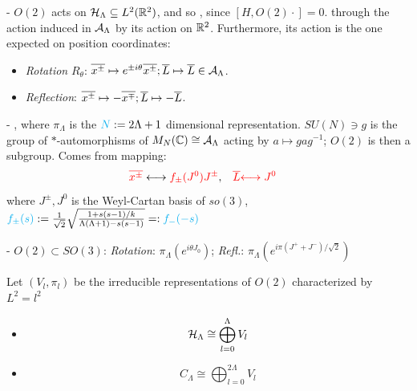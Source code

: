{
    \color{gray}
    
    - $O(2)$ acts on $\mathcal H_\Lambda \subseteq L^2(\mathbb{R}^2)$, and so , since $[H, O(2)\cdot ] = 0$. through the action induced in $\mathcal A_\Lambda$ by its action on $\mathbb{R}^2$. Furthermore, its action is the one expected on position coordinates:
        \begin{itemize}
            
        \item \textit{Rotation} $R_\theta$: $\overline{x^\pm} \mapsto e^{\pm i \theta} \overline{x ^\pm}; \overline{L} \mapsto \overline{L} \in \mathcal A_\Lambda$.
        
        \item \textit{Reflection}: $\overline{x^\pm} \mapsto -\overline{x^\mp}; \overline{L} \mapsto -\overline{L}$.
        
        \end{itemize}
    
    - , where $\pi_\Lambda$ is the $\textcolor{cyan}{N} := 2 \Lambda + 1$ dimensional representation. $SU(N) \ni g$ is the group of $*$-automorphisms of $M_N(\mathbb{C}) \cong \mathcal A_\Lambda$ acting by $a \mapsto g a g^{-1}$; $O(2)$ is then a subgroup. Comes from mapping:
    \begin{align}
        \textcolor{red}{\overline{x^\pm}} &\longleftrightarrow \textcolor{red}{f_\pm (J^0) J^\pm}, &
        \textcolor{red}{\overline{L} }& \textcolor{red}{\longleftrightarrow J^0}
    \end{align}
    where $J^\pm, J^0$ is the Weyl-Cartan basis of $so(3)$, $\textcolor{cyan}{f_\pm(s)} := \frac{1}{\sqrt{2}} \sqrt{\frac{1 + s(s-1)/k}{\Lambda (\Lambda + 1) - s(s-1)}} =: \textcolor{cyan}{f_-(-s)}$%

    - $O(2) \subset SO(3)$: \textit{Rotation}: $\pi_\Lambda(e^{i \theta J_0})$; \textit{Refl.}: $\pi_\Lambda(e^{i\pi (J^+ + J^-)/\sqrt{2}})$
    
    \lin 
    
    Let $(V_l, \pi_l)$ be the irreducible representations of $O(2)$ characterized by $L^2 = l^2$
    
        \begin{itemize}
        
        \item  \begin{equation}
            \mathcal H_\Lambda \cong \bigoplus_{l = 0}^\Lambda V_l
        \end{equation}
        
        \item \begin{equation}
            C_\Lambda \cong \bigoplus_{l = 0}^{2\Lambda} V_l
        \end{equation}
        
        \end{itemize}
        
}

